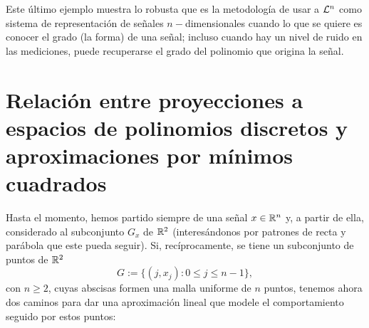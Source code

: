Este último ejemplo muestra lo robusta que es la metodología
de usar a $\mathcal{L}^{n}$ como sistema de representación
de señales $n-$dimensionales cuando lo que se quiere es 
conocer el grado (la forma) de una señal; incluso cuando hay 
un nivel de ruido en las mediciones, puede 
recuperarse el grado del polinomio que origina la señal.

\section{Relación entre proyecciones a espacios de polinomios discretos y aproximaciones por mínimos cuadrados}
\label{Relación entre proyecciones a espacios de polinomios discretos y aproximaciones por mínimos cuadrados}

Hasta el momento, hemos partido siempre
de una señal $x \in \mathbb{R}^{n}$
y, a partir de ella, considerado al subconjunto $G_{x}$ 
de $\mathbb{R}^{2}$ (interesándonos por patrones de 
recta y parábola que este pueda seguir).
Si, recíprocamente, se tiene un 
subconjunto de puntos de $\mathbb{R}^{2}$ 
\begin{equation}
\label{eq: Halloween!}
G:=\{(j, x_{j}): 0 \leq j \leq n-1 \},
\end{equation}
con $n \geq 2$,
cuyas abscisas formen una malla uniforme
de $n$ puntos, tenemos ahora dos caminos
para dar una aproximación lineal
que modele el comportamiento 
seguido por estos puntos:

